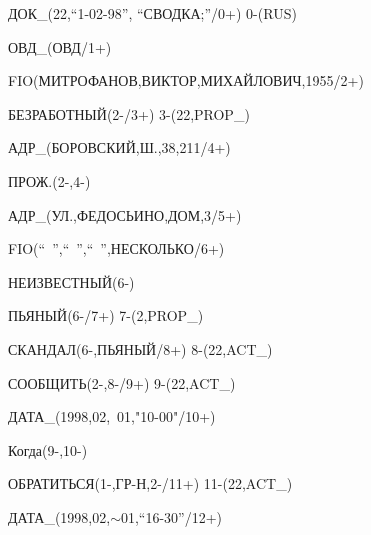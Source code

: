 {\sf    ДОК\_(22,``1-02-98'', ``СВОДКА;''/0+)  0-(RUS)


   


    ОВД\_(ОВД/1+)  


   


    FIO(МИТРОФАНОВ,ВИКТОР,МИХАЙЛОВИЧ,1955/2+)  


   


    БЕЗРАБОТНЫЙ(2-/3+)  3-(22,PROP\_)


   


    АДР\_(БОРОВСКИЙ,Ш.,38,211/4+)  


   


    ПРОЖ.(2-,4-)


   


    АДР\_(УЛ.,ФЕДОСЬИНО,ДОМ,3/5+) 


   


    FIO(``~'',``~'',``~'',НЕСКОЛЬКО/6+)  


   


    НЕИЗВЕСТНЫЙ(6-)


   


    ПЬЯНЫЙ(6-/7+)  7-(2,PROP\_)


   


    СКАНДАЛ(6-,ПЬЯНЫЙ/8+)  8-(22,ACT\_)


   


    СООБЩИТЬ(2-,8-/9+)  9-(22,ACT\_)


   


    ДАТА\_(1998,02,~01,"10-00"/10+)  


   


    Когда(9-,10-)


   


    ОБРАТИТЬСЯ(1-,ГР-Н,2-/11+)  11-(22,ACT\_)


   


    ДАТА\_(1998,02,$\sim$01,``16-30''/12+)  


   


}
